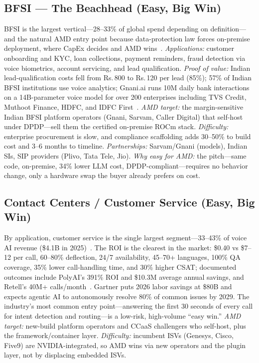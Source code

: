 \documentclass[blind]{gtac}
\providecommand{\rupee}{\ensuremath{\text{\rm\textsf{R}}}} %
\renewcommand{\rupee}{Rs.\,} %
\begin{document}
\subsection{BFSI --- The Beachhead (Easy, Big Win)}
BFSI is the largest vertical---28--33\% of global spend depending on definition---and the natural AMD entry point because data-protection law forces on-premise deployment, where CapEx decides and AMD wins~\cite{marketus_voiceagents,nextlevel_roi}. \emph{Applications:} customer onboarding and KYC, loan collections, payment reminders, fraud detection via voice biometrics, account servicing, and lead qualification. \emph{Proof of value:} Indian lead-qualification costs fell from \rupee 800 to \rupee 120 per lead (85\%); 57\% of Indian BFSI institutions use voice analytics; Gnani.ai runs 10M daily bank interactions on a 14B-parameter voice model for over 200 enterprises including TVS Credit, Muthoot Finance, HDFC, and IDFC First~\cite{india_guide,inc42_sarvam}. \emph{AMD target:} the margin-sensitive Indian BFSI platform operators (Gnani, Sarvam, Caller Digital) that self-host under DPDP---sell them the certified on-premise ROCm stack. \emph{Difficulty:} enterprise procurement is slow, and compliance scaffolding adds 30--50\% to build cost and 3--6 months to timeline. \emph{Partnerships:} Sarvam/Gnani (models), Indian SIs, SIP providers (Plivo, Tata Tele, Jio). \emph{Why easy for AMD:} the pitch---same code, on-premise, 34\% lower LLM cost, DPDP-compliant---requires no behavior change, only a hardware swap the buyer already prefers on cost.

\subsection{Contact Centers / Customer Service (Easy, Big Win)}
By application, customer service is the single largest segment---33--43\% of voice AI revenue (\$4.1B in 2025)~\cite{nextlevel_roi,telnyx_europe}. The ROI is the clearest in the market: \$0.40 vs \$7--12 per call, 60--80\% deflection, 24/7 availability, 45--70+ languages, 100\% QA coverage, 35\% lower call-handling time, and 30\% higher CSAT; documented outcomes include PolyAI's 391\% ROI and \$10.3M average annual savings, and Retell's 40M+ calls/month~\cite{assemblyai_2026,nextlevel_roi}. Gartner puts 2026 labor savings at \$80B and expects agentic AI to autonomously resolve 80\% of common issues by 2029. The industry's most common entry point---answering the first 30 seconds of every call for intent detection and routing---is a low-risk, high-volume ``easy win.'' \emph{AMD target:} new-build platform operators and CCaaS challengers who self-host, plus the framework/container layer. \emph{Difficulty:} incumbent ISVs (Genesys, Cisco, Five9) are NVIDIA-integrated, so AMD wins via new operators and the plugin layer, not by displacing embedded ISVs.
\end{document}
